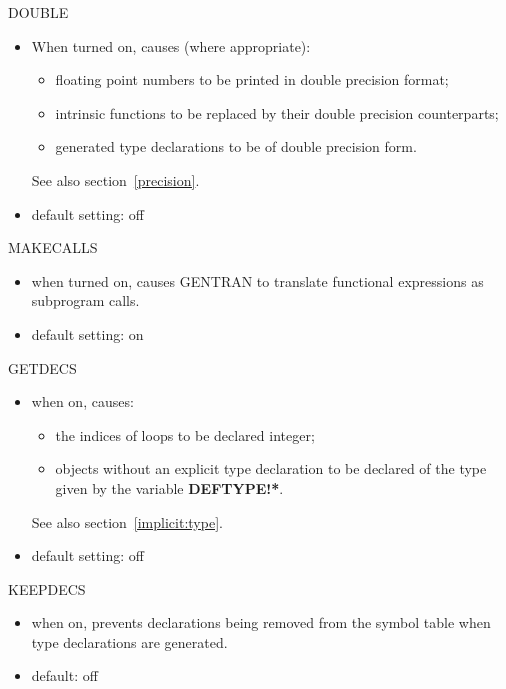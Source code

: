 \begin{describe}{DOUBLE}
\begin{itemize}
\item When turned on, causes (where appropriate):
\begin{itemize}
\item floating point numbers to be printed in double precision format;
\item intrinsic functions to be replaced by their double precision
counterparts;
\item generated type declarations to be of double precision form.
\end{itemize}
See also section~\ref{precision}.
\item default setting: off
\end{itemize}
\end{describe}
\begin{describe}{MAKECALLS}
\begin{itemize}
\item when turned on, causes GENTRAN to translate functional expressions as
subprogram calls.
\item default setting: on
\end{itemize}
\end{describe}
\begin{describe}{GETDECS}
\begin{itemize}
\item when on, causes:
\begin{itemize}
\item the indices of loops to be declared integer;
\item objects without an explicit type declaration to be declared of the type
given by the variable {\bf DEFTYPE!*}.
\end{itemize}
See also section~\ref{implicit:type}.
\item default setting:  off
\end{itemize}
\end{describe}
\begin{describe}{KEEPDECS}
\begin{itemize}
\item when on, prevents declarations being removed from the symbol table when
type declarations are generated.
\item default: off
\end{itemize}
\end{describe}

